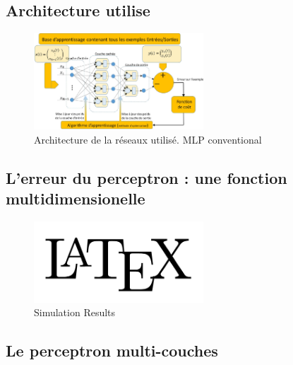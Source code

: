 \documentclass[journal]{IEEEtran}
\begin{document}
\subsection{Architecture utilise}

\begin{figure}[h]
	\centering
	\includegraphics[width=2.5in]{arch}
	\caption{Architecture de la réseaux utilisé. MLP conventional }
	\label{fig:ArchitectureMLP}
\end{figure}




\subsection{L’erreur du perceptron : une fonction multidimensionelle}\blindtext

\begin{figure}[h]
	\centering
	\includegraphics[width=2.5in]{logo}
	\caption{Simulation Results}
	\label{fig_sim}
\end{figure}

\subsection{Le perceptron multi-couches}\blindtext
\end{document}
